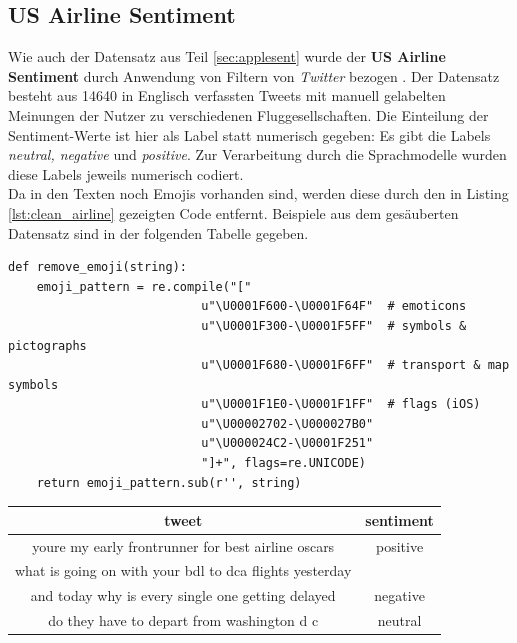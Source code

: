 \subsection{US Airline Sentiment}
\label{sec:airlinesent}
Wie auch der Datensatz aus Teil \ref{sec:applesent} wurde der \textbf{US Airline Sentiment} durch Anwendung von Filtern von \textit{Twitter} bezogen \cite{airlines}. Der Datensatz besteht aus 14640 in Englisch verfassten Tweets mit manuell gelabelten Meinungen der Nutzer zu verschiedenen Fluggesellschaften. Die Einteilung der Sentiment-Werte ist hier als Label statt numerisch gegeben: Es gibt die Labels \textit{neutral, negative} und \textit{positive}. Zur Verarbeitung durch die Sprachmodelle wurden diese Labels jeweils numerisch codiert.\\
Da in den Texten noch Emojis vorhanden sind, werden diese durch den in Listing \ref{lst:clean_airline} gezeigten Code entfernt. Beispiele aus dem ges\"auberten Datensatz sind in der folgenden Tabelle gegeben.
\lstset{language=Python}
\lstset{frame=lines}
\lstset{captionpos=b}
\lstset{basicstyle=\footnotesize}
\begin{lstlisting}
def remove_emoji(string):
    emoji_pattern = re.compile("["
                           u"\U0001F600-\U0001F64F"  # emoticons
                           u"\U0001F300-\U0001F5FF"  # symbols & pictographs
                           u"\U0001F680-\U0001F6FF"  # transport & map symbols
                           u"\U0001F1E0-\U0001F1FF"  # flags (iOS)
                           u"\U00002702-\U000027B0"
                           u"\U000024C2-\U0001F251"
                           "]+", flags=re.UNICODE)
    return emoji_pattern.sub(r'', string)
\end{lstlisting}
\begin{center}
\begin{tabular}{|c|c|}
\hline
tweet & sentiment\\ 
\hline\hline
youre my early frontrunner for best airline  oscars&positive\\
\hline
what is going on with your bdl to dca flights yesterday&\\ and today   why is every single one getting delayed&negative\\
\hline
do they have to depart from washington  d  c&neutral\\
\hline    
\end{tabular}
\end{center}

